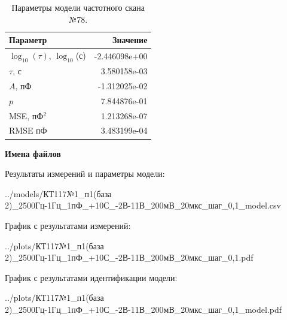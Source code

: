 \begin{table}[!ht]
    \centering
    \caption{Параметры модели частотного скана №78.}
    \begin{tabular}{|l|r|}
        \hline
        Параметр                                       & Значение                  \\ \hline
        $\log_{10}(\tau)$, $\log_{10}$(с)              & -2.446098e+00             \\ \hline
        $\tau$, с                                      & 3.580158e-03              \\ \hline
        $A$, пФ                                        & -1.312025e-02             \\ \hline
        $p$                                            & 7.844876e-01              \\ \hline
        MSE, пФ$^2$                                    & 1.213268e-07              \\ \hline
        RMSE пФ                                        & 3.483199e-04              \\ \hline
    \end{tabular}
    \label{table:frequency_scan_model_78}
\end{table}

\textbf{Имена файлов}

Результаты измерений и параметры модели:

\scriptsize../models/КТ117№1\_п1(база 2)\_2500Гц-1Гц\_1пФ\_+10С\_-2В-11В\_200мВ\_20мкс\_шаг\_0,1\_model.csv
\normalsize

График с результатами измерений:

\scriptsize../plots/КТ117№1\_п1(база 2)\_2500Гц-1Гц\_1пФ\_+10С\_-2В-11В\_200мВ\_20мкс\_шаг\_0,1.pdf
\normalsize

График с результатами идентификации модели:

\scriptsize../plots/КТ117№1\_п1(база 2)\_2500Гц-1Гц\_1пФ\_+10С\_-2В-11В\_200мВ\_20мкс\_шаг\_0,1\_model.pdf
\normalsize

